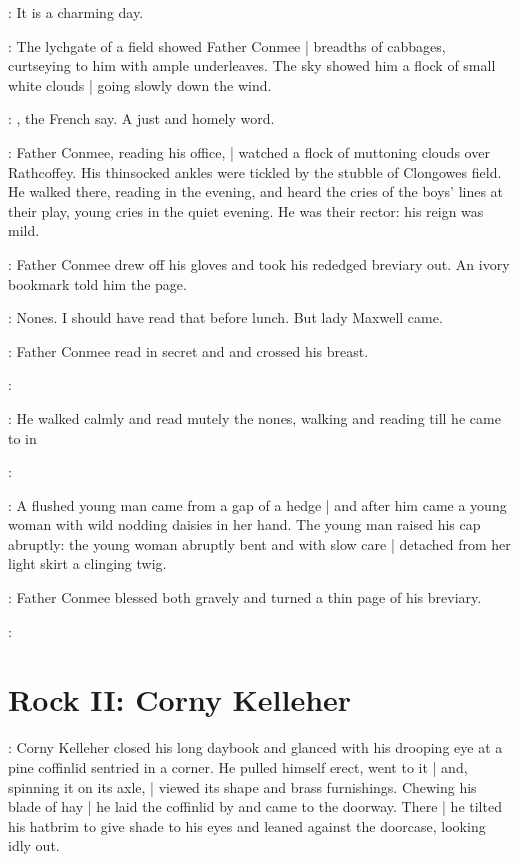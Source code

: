 \conmeeint:
It is a charming day.

:
The lychgate of a field showed Father Conmee |
breadths of cabbages,
curtseying to him with ample underleaves.
The sky showed him a flock of small white clouds |
going slowly down the wind.

\conmeeint:
, the French say.
A just and homely word.

:
Father Conmee, reading his office, |
watched a flock of muttoning clouds over Rathcoffey.
His thinsocked ankles were tickled by the stubble of Clongowes field.
He walked there, reading in the evening,
and heard the cries of the boys' lines at their play,
young cries in the quiet evening.
He was their rector: his reign was mild.

:
Father Conmee drew off his gloves
and took his rededged breviary out.%
An ivory bookmark told him the page.

\conmeeint:
Nones.
I should have read that before lunch.
But lady Maxwell came.

:
Father Conmee read in secret  and 
and crossed his breast.

\conmeeint:

:
He walked calmly and read mutely the nones,
walking and reading till
he came to
 in

\conmeeint:

:
A flushed young man came from a gap of a hedge |
and after him came a young woman
with wild nodding daisies in her hand.%
The young man raised his cap abruptly:
the young woman abruptly bent
and with slow care |
detached from her light skirt a clinging twig.

:
Father Conmee blessed both gravely
and turned a thin page of his breviary.

\conmeeint:


\section*{Rock II: Corny Kelleher}

:
Corny Kelleher closed his long daybook
and glanced with his drooping eye
at a pine coffinlid sentried in a corner.
He pulled himself erect,
went to it |
and, spinning it on its axle, |
viewed its shape and brass furnishings.%
Chewing his blade of hay |
he laid the coffinlid by and came to the doorway.
There |
he tilted his hatbrim to give shade to his eyes
and leaned against the doorcase,
looking idly out.

